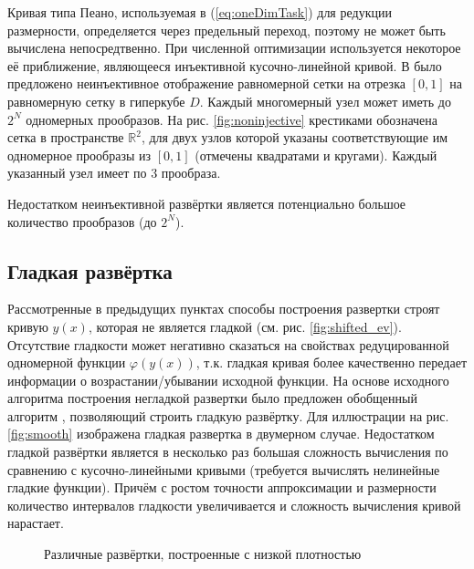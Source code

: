 Кривая типа Пеано, используемая в (\ref{eq:oneDimTask}) для редукции размерности, определяется через предельный переход,
поэтому не может быть вычислена непосредтвенно. При численной оптимизации используется некоторое её приближение, являющееся
инъективной кусочно-линейной кривой. В \cite{strongin1978} было предложено неинъективное отображение равномерной сетки на
отрезка $[0,1]$ на равномерную сетку в гиперкубе $D$. Каждый многомерный узел может иметь до $2^N$ одномерных прообразов.
На рис. \ref{fig:noninjective} крестиками обозначена сетка в пространстве $\mathbb{R}^2$, для двух узлов которой
указаны соответствующие им одномерное прообразы из $[0,1]$ (отмечены квадратами и кругами). Каждый указанный узел имеет по 3 прообраза.

Недостатком неинъективной развёртки является потенциально большое количество прообразов (до $2^N$).


\subsection{Гладкая развёртка}

Рассмотренные в предыдущих пунктах способы построения развертки строят кривую $y(x)$, которая не является
гладкой (см. рис. \ref{fig:shifted_ev}). Отсутствие гладкости может негативно сказаться на свойствах редуцированной
одномерной функции $\varphi(y(x))$, т.к. гладкая кривая более качественно передает информации о возрастании/убывании
исходной функции. На основе исходного алгоритма построения негладкой развертки было предложен обобщенный алгоритм
\cite{Goryachih2017}, позволяющий строить гладкую развёртку. Для иллюстрации на рис. \ref{fig:smooth} изображена гладкая
развертка в двумерном случае. Недостатком гладкой развёртки является в несколько раз большая сложность вычисления по
сравнению с кусочно-линейными кривыми (требуется вычислять нелинейные гладкие функции). Причём с ростом точности аппроксимации и
размерности количество интервалов гладкости увеличивается и сложность вычисления кривой нарастает.

\begin{figure}[ht]
    \centering
    \caption{Различные развёртки, построенные с низкой плотностью}
\end{figure}


